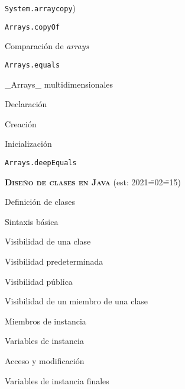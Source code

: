 \begin{longenum}
\begin{longenum}
\begin{longenum}
\begin{longenum}
                \item \texttt{System.arraycopy})
                \item \texttt{Arrays.copyOf}
            \end{longenum}
            \item Comparación de \textit{arrays}
            \begin{longenum}
                \item \texttt{Arrays.equals}
            \end{longenum}
            \item \_Arrays\_ multidimensionales
            \begin{longenum}
                \item Declaración
                \item Creación
                \item Inicialización
                \item \texttt{Arrays.deepEquals}
            \end{longenum}
        \end{longenum}
    \end{longenum}
    \item \textbf{\textsc{Diseño de clases en Java}} (est: 2021\==02\==15)
    \begin{longenum}
        \item Definición de clases
        \begin{longenum}
            \item Sintaxis básica
            \item Visibilidad de una clase
            \begin{longenum}
                \item Visibilidad predeterminada
                \item Visibilidad pública
            \end{longenum}
            \item Visibilidad de un miembro de una clase
        \end{longenum}
        \item Miembros de instancia
        \begin{longenum}
            \item Variables de instancia
            \begin{longenum}
                \item Acceso y modificación
                \item Variables de instancia finales

\end{longenum}
\end{longenum}
\end{longenum}
\end{longenum}
